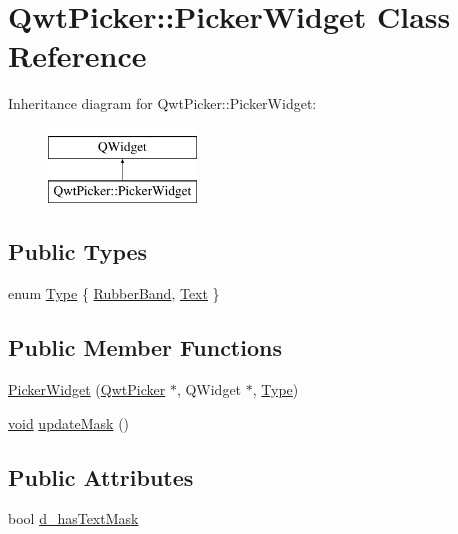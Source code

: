 \hypertarget{class_qwt_picker_1_1_picker_widget}{\section{Qwt\-Picker\-:\-:Picker\-Widget Class Reference}
\label{class_qwt_picker_1_1_picker_widget}
}
Inheritance diagram for Qwt\-Picker\-:\-:Picker\-Widget\-:\begin{figure}[H]
\begin{center}
\leavevmode
\includegraphics[height=2.000000cm]{class_qwt_picker_1_1_picker_widget}
\end{center}
\end{figure}
\subsection*{Public Types}
\begin{DoxyCompactItemize}
\item 
enum \hyperlink{class_qwt_picker_1_1_picker_widget_a874ed63e86ce1a6a7a80cceca11fcfd9}{Type} \{ \hyperlink{class_qwt_picker_1_1_picker_widget_a874ed63e86ce1a6a7a80cceca11fcfd9a55892e84ca6bc086fff73004ebabaf95}{Rubber\-Band}, 
\hyperlink{class_qwt_picker_1_1_picker_widget_a874ed63e86ce1a6a7a80cceca11fcfd9a302120541c1f6e2f6099767e8f8fd276}{Text}
 \}
\end{DoxyCompactItemize}
\subsection*{Public Member Functions}
\begin{DoxyCompactItemize}
\item 
\hyperlink{class_qwt_picker_1_1_picker_widget_a8ca33ab41d40181996088b2d19d977e9}{Picker\-Widget} (\hyperlink{class_qwt_picker}{Qwt\-Picker} $\ast$, Q\-Widget $\ast$, \hyperlink{class_qwt_picker_1_1_picker_widget_a874ed63e86ce1a6a7a80cceca11fcfd9}{Type})
\item 
\hyperlink{group___u_a_v_objects_plugin_ga444cf2ff3f0ecbe028adce838d373f5c}{void} \hyperlink{class_qwt_picker_1_1_picker_widget_a4b60a27f25a17ca2c6744834546476ec}{update\-Mask} ()
\end{DoxyCompactItemize}
\subsection*{Public Attributes}
\begin{DoxyCompactItemize}
\item 
bool \hyperlink{class_qwt_picker_1_1_picker_widget_a5b1fb5a91b39c4ed9e8ed80fb10b8ae6}{d\-\_\-has\-Text\-Mask}
\end{DoxyCompactItemize}
